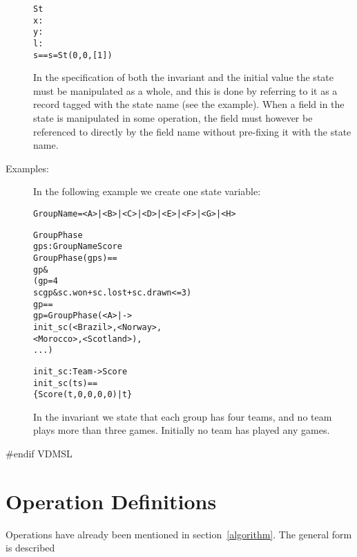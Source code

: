 \documentclass[\pformat,12pt]{article}
\begin{document}
\begin{description}
  \begin{alltt}
   St 
    x:
    y:
    l:
   s == s = St(0,0,[1])
  \end{alltt}

  In the specification of both the invariant and the initial value the
  state must be manipulated as a whole, and this is done by referring to it
  as a record tagged with the state name (see the example). When a field in
  the state is manipulated in some operation, the field must however be
  referenced to directly by the field name without pre-fixing it with the
  state name.

\item[Examples:] In the following example we create one state variable:
  \begin{alltt}

  GroupName = <A> | <B> | <C> | <D> | <E> | <F> | <G> | <H>

   GroupPhase 
    gps :  GroupName  Score
  GroupPhase(gps) ==
     gp  & 
      ( gp = 4 
        sc  gp & sc.won + sc.lost + sc.drawn <= 3)
   gp ==
    gp = GroupPhase ({ <A> |-> 
                                init_sc ({<Brazil>, <Norway>, 
                                    <Morocco>, <Scotland>}),
                         ...})


  init_sc :  Team ->  Score
  init_sc (ts) ==
    \{ Score (t,0,0,0,0) | t  \}
  \end{alltt}
  In the invariant we state that each group has four teams, and no team 
  plays more than three games. Initially no team has played any games.

\end{description}
#endif VDMSL

\section{Operation Definitions} \label{op-def}

Operations have already been mentioned in section~\ref{algorithm}. The
general form is described
\end{document}

